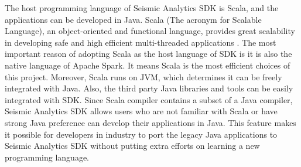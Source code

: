 The host programming language of Seismic Analytics SDK is Scala, and the applications can be developed in Java. Scala (The acronym for Scalable Language), an object-oriented and functional language, provides great scalability in developing safe and high efficient multi-threaded applications \cite{ScalaOrg}. The most important reason of adopting Scala as the host language of SDK is it is also the native language of Apache Spark. It means Scala is the most efficient choices of this project. Moreover, Scala runs on JVM, which determines it can be freely integrated with Java. Also, the third party Java libraries and tools can be easily integrated with SDK. Since Scala compiler contains a subset of a Java compiler, Seismic Analytics SDK allows users who are not familiar with Scala or have strong Java preference can develop their applications in Java. This feature makes it possible for developers in industry to port the legacy Java applications to Seismic Analytics SDK without putting extra efforts on learning a new programming language.

